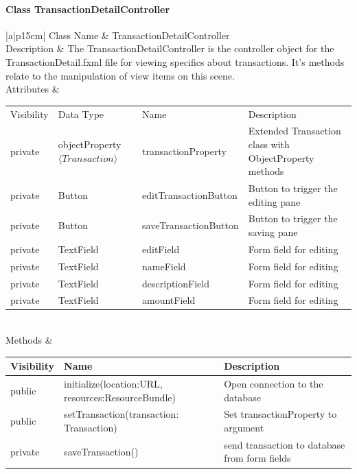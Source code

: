 \documentclass[12pt]{article}
\begin{document}
\paragraph{Class TransactionDetailController}
\begin{table}[H]
	\begin{tabular}{|a|p{15cm}|}
		\hline
		{Class Name} & {TransactionDetailController} \\
		\hline
		Description & The TransactionDetailController is the controller object for the TransactionDetail.fxml file for viewing specifics about transactions. It's methods relate to the manipulation of view items on this scene.\\
		\hline
		Attributes & 
		\begin{tabular}{| p{1.5cm} | p{2.5cm} | p{4.45cm} | p{5.0cm} |}
			\hline
			\rowcolor{lightgray}
			Visibility & Data Type & Name & Description \\
			\rowcolor{white}
			\hline
			private & objectProperty $\langle Transaction \rangle$ & transactionProperty & Extended Transaction class with ObjectProperty methods \\
			\hline
			private & Button & editTransactionButton & Button to trigger the editing pane \\
			\hline
			private & Button & saveTransactionButton & Button to trigger the saving pane\\
			\hline
			private & TextField & editField & Form field for editing\\
			\hline
			private & TextField & nameField & Form field for editing\\
			\hline
			private & TextField & descriptionField & Form field for editing\\		
			\hline
			private & TextField & amountField & Form field for editing\\		
			\hline
		\end{tabular} \\
		\hline
		Methods & 		 
		\begin{tabular}{| p{1.5cm} | p{6.5cm} | p{5.9cm} |}
			\hline
			\rowcolor{gray}
			{Visibility} &{Name} & {Description} \\
			\hline
			\rowcolor{white}			
			public &  initialize(location:URL, resources:ResourceBundle) & Open connection to the database \\
			\hline
			public &  setTransaction(transaction: Transaction) & Set transactionProperty to argument\\
			\hline
			private &  saveTransaction() & send transaction to database from form fields\\

\end{tabular}
\end{tabular}
\end{table}
\end{document}
